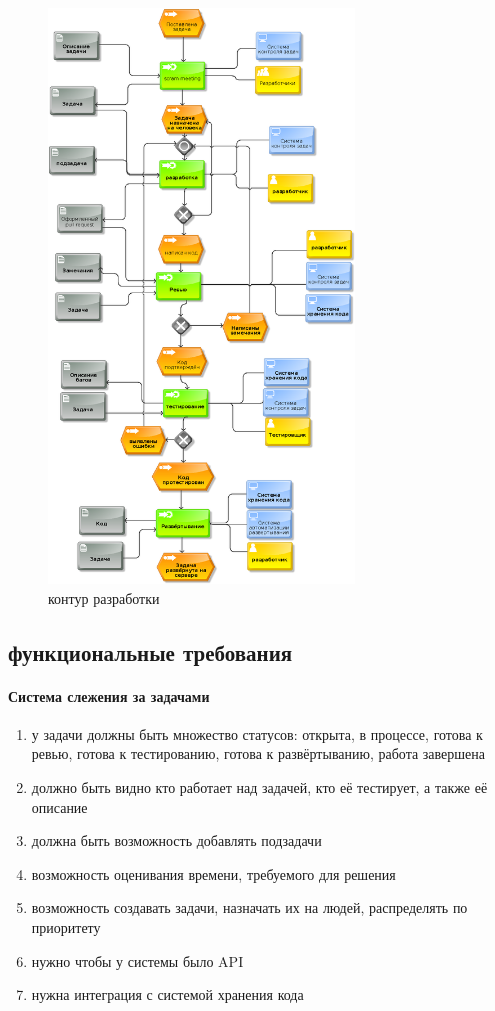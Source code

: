 \documentclass{article}
\begin{document}
\begin{figure}[h!]
    \includegraphics[height=6in]{pictures/2.png}
    \caption{контур разработки \cite{wiki}}
\end{figure}
\pagebreak
{}

\subsection{функциональные требования}
\paragraph{Система слежения за задачами}
\begin{enumerate}
    \item{у задачи должны быть множество статусов:
    открыта, в процессе, готова к ревью, готова к тестированию, готова к развёртыванию, работа завершена}
    \item{должно быть видно кто работает над задачей, кто её тестирует, а также её описание}
    \item{должна быть возможность добавлять подзадачи}
    \item{возможность оценивания времени, требуемого для решения}
    \item{возможность создавать задачи, назначать их на людей, распределять по приоритету}
    \item{нужно чтобы у системы было API}
    \item{нужна интеграция с системой хранения кода}
\end{enumerate}
\end{document}
